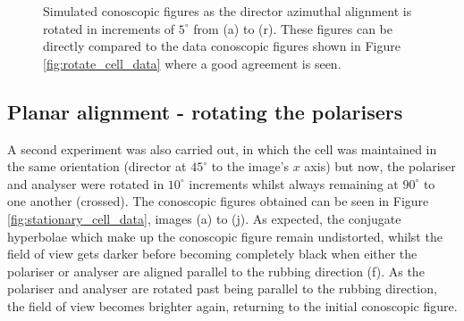 \begin{figure}
\begin{center}
\end{center}
\caption[Simulated conoscopic images of a planar cell - rotating]{\label{fig:rotate_cell_model}Simulated conoscopic figures as the director azimuthal alignment is rotated in increments of $5^\circ$ from (a) to (r). These figures can be directly compared to the data conoscopic figures shown in Figure \ref{fig:rotate_cell_data} where a good agreement is seen.}
\end{figure}

\subsection{Planar alignment - rotating the polarisers}
A second experiment was also carried out, in which the cell was maintained in the same orientation (director at $45^\circ$ to the image's $x$ axis) but now, the polariser and analyser were rotated in $10^\circ$ increments whilst always remaining at $90^\circ$ to one another (crossed). The conoscopic figures obtained can be seen in Figure \ref{fig:stationary_cell_data}, images (a) to (j). As expected, the conjugate hyperbolae which make up the conoscopic figure remain undistorted, whilst the field of view gets darker before becoming completely black when either the polariser or analyser are aligned parallel to the rubbing direction (f). As the polariser and analyser are rotated past being parallel to the rubbing direction, the field of view becomes brighter again, returning to the initial conoscopic figure.

